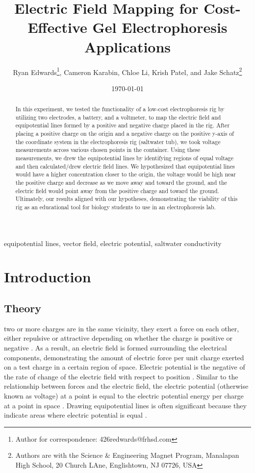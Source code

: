 \documentclass[10pt,journal,twoside]{IEEEtran}
\title{Electric Field Mapping for Cost-Effective Gel Electrophoresis Applications}
\author{Ryan Edwards\thanks{Author for correspondence: 426redwards@frhsd.com}, Cameron Karabin, Chloe Li, Krish Patel, and Jake Schatz\thanks{Authors are with the Science \& Engineering Magnet Program, Manalapan High School, 20 Church LAne, Englishtown, NJ 07726, USA}}
\date{\today}
\begin{document}
\maketitle

\begin{abstract}
In this experiment, we tested the functionality of a low-cost electrophoresis rig by utilizing two electrodes, a battery, and a voltmeter, to map the electric field and equipotential lines formed by a positive and negative charge placed in the rig. After placing a positive charge on the origin and a negative charge on the positive y-axis of the coordinate system in the electrophoresis rig (saltwater tub), we took voltage measurements across various chosen points in the container. Using these measurements, we drew the equipotential lines by identifying regions of equal voltage and then calculated/drew electric field lines. We hypothesized that equipotential lines would have a higher concentration closer to the origin, the voltage would be high near the positive charge and decrease as we move away and toward the ground, and the electric field would point away from the positive charge and toward the ground. Ultimately, our results aligned with our hypotheses, demonstrating the viability of this rig as an educational tool for biology students to use in an electrophoresis lab.
\end{abstract}

\begin{IEEEkeywords}
equipotential lines, vector field, electric potential, saltwater conductivity
\end{IEEEkeywords}





\section{Introduction}
\subsection{Theory}
 two or more charges are in the same vicinity, they exert a force on each other, either repulsive or attractive depending on whether the charge is positive or negative \cite{tipler}. As a result, an electric field is formed surrounding the electrical components, demonstrating the amount of electric force per unit charge exerted on a test charge in a certain region of space. Electric potential is the negative of the rate of change of the electric field with respect to position \cite{tipler}. Similar to the relationship between forces and the electric field, the electric potential (otherwise known as voltage) at a point is equal to the electric potential energy per charge at a point in space \cite{tipler}. Drawing equipotential lines is often significant because they indicate areas where electric potential is equal \cite{cantt-2013-equipotential,fongsuwan-2019-system}.
\end{document}
